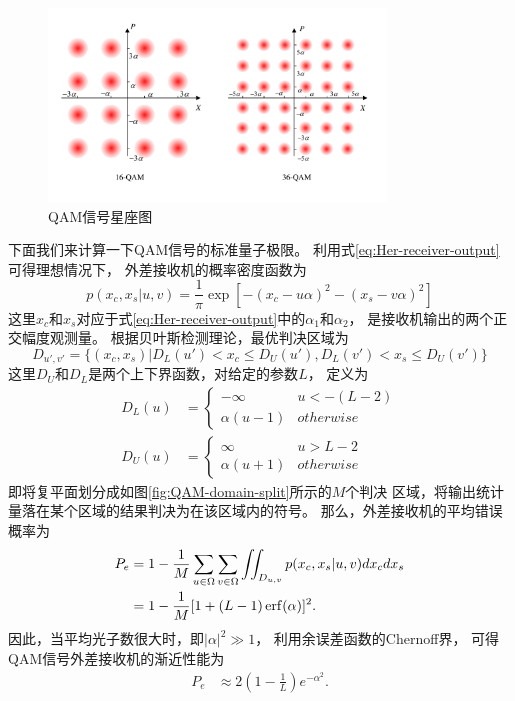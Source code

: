 \begin{figure}
\centering
  \includegraphics[width=0.8\textwidth]{figures/chap3/QAM-signals}
  \caption{QAM信号星座图}
  \label{fig:QAM-signals}
\end{figure}


下面我们来计算一下QAM信号的标准量子极限。
利用式\ref{eq:Her-receiver-output}可得理想情况下，
外差接收机的概率密度函数为\cite{kato1999quantum}
\begin{equation}
p(x_c, x_s| u, v) = \frac{1}{\pi} \exp[-(x_c - u\alpha)^2 - (x_s - v\alpha)^2]
\end{equation}
这里$x_c$和$x_s$对应于式\ref{eq:Her-receiver-output}中的$\alpha_1$和$\alpha_2$，
是接收机输出的两个正交幅度观测量。
根据贝叶斯检测理论，最优判决区域为
\begin{equation}
D_{u',v'} = \{ (x_c,x_s)| D_L(u') < x_c \le D_U(u'),  D_L(v') < x_s \le D_U(v') \}
\end{equation}
这里$D_U$和$D_L$是两个上下界函数，对给定的参数$L$，
定义为
\begin{equation}
\begin{split}
D_L(u) &= \begin{cases}    
          -\infty     & u < -(L-2)  \\
          \alpha(u-1) & otherwise
         \end{cases}\\
D_U(u) &= \begin{cases} 
          \infty     & u > L-2  \\
          \alpha(u+1) & otherwise
         \end{cases}
\end{split}
\end{equation}
即将复平面划分成如图\ref{fig:QAM-domain-split}所示的$M$个判决
区域，将输出统计量落在某个区域的结果判决为在该区域内的符号。
那么，外差接收机的平均错误概率为
\begin{equation}
\begin{split}
P_e &= 1 - \frac{1}{M} \sum_{u\in\Omega}\sum_{v\in\Omega} \iint_{D_{u,v}} p(x_c,x_s|u,v) dx_c dx_s \\
    &= 1 - \frac{1}{M}[1+(L-1) \erf(\alpha)]^2.
\end{split}
\end{equation}
因此，当平均光子数很大时，即$|\alpha|^2 \gg 1$，
利用余误差函数的Chernoff界\cite{chang2011chernoff}，
可得QAM信号外差接收机的渐近性能为
\begin{equation}
\begin{split}
P_e &\approx 2(1 - \frac{1}{L}) e^{-\alpha^2}.
\label{eq:QAM-SQL-approx}
\end{split}
\end{equation}

